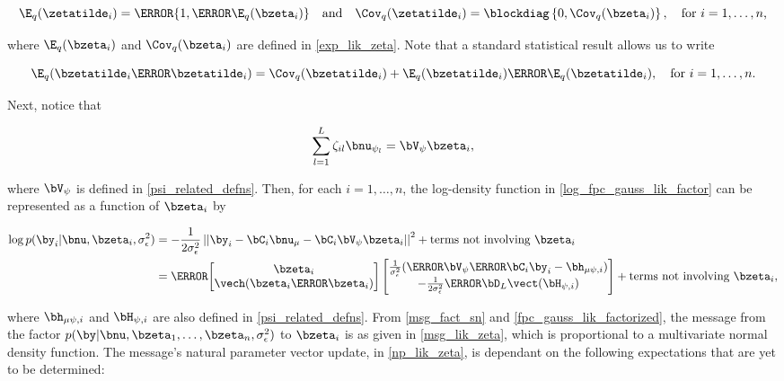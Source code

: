 \documentclass[12pt]{article}
\def\sigsqeps{\sigma^2_{\epsilon}}
\def\numu{\bnu_\mu}
\def\Vpsi{\bV_\psi}
\newcommand\nupsi[1]{\bnu_{\psi_{#1}}}
\newcommand\hmupsi[1]{\bh_{\mu \psi, i}}
\newcommand\Hpsi[1]{\bH_{\psi, i}}
\newcommand\tni[1]{\text{terms not involving $#1$}}
\theoremstyle{plain}
\theoremstyle{definition}
\theoremstyle{remark}
\begin{document}
\begin{equation}
	\E_q (\zetatilde_i) = \T{\{ 1, \T{\E_q (\bzeta_i)} \}} \quad
	\text{and} \quad
	\Cov_q (\zetatilde_i) = \blockdiag \left\{ 0, \Cov_q (\bzeta_i) \right\}, \quad
	\text{for $i = 1, \dots, n$,}
\label{exp_lik_zeta_tilde}
\end{equation}

\noindent where $\E_q (\bzeta_i)$ and $\Cov_q (\bzeta_i)$ are defined in \eqref{exp_lik_zeta}. Note that
a standard statistical result allows us to write

\begin{equation}
	\E_q (\bzetatilde_i \T{\bzetatilde_i}) =
		\Cov_q (\bzetatilde_i) + \E_q (\bzetatilde_i) \T{\E_q (\bzetatilde_i)}, \quad \text{for $i = 1, \dots, n$.}
\label{E_q_outer_zeta}
\end{equation}

Next, notice that

\begin{equation}
	\sum_{l=1}^L \zeta_{il} \nupsi{l} = \Vpsi \bzeta_i,
\label{zeta_simplification}
\end{equation}

\noindent where $\Vpsi$ is defined in \eqref{psi_related_defns}. Then, for each $i = 1, \dots, n$, the log-density function
in \eqref{log_fpc_gauss_lik_factor} can be represented as a function of $\bzeta_i$ by

\begin{align*}
	\log p (\by_i | \bnu, \bzeta_i, \sigsqeps)
		& = -\frac{1}{2\sigsqeps} \left|\left|
			\by_i - \bC_i \numu - \bC_i \Vpsi \bzeta_i
		\right|\right|^2 + \tni{\bzeta_i} \\
		& = \T{
			\begin{bmatrix}
				\bzeta_i \\
				\vech (\bzeta_i \T{\bzeta_i})
			\end{bmatrix}
		} \begin{bmatrix}
			\frac{1}{\sigsqeps} (\T{\Vpsi} \T{\bC_i} \by_i - \hmupsi{i}) \\
			-\frac{1}{2 \sigsqeps} \T{\bD_L} \vect (\Hpsi{i})
		\end{bmatrix} + \tni{\bzeta_i},
\end{align*}

\noindent where $\hmupsi{i}$ and $\Hpsi{i}$ are also defined in \eqref{psi_related_defns}.
\noindent From \eqref{msg_fact_sn} and \eqref{fpc_gauss_lik_factorized}, the message from the factor
$p (\by | \bnu, \bzeta_1, \dots, \bzeta_n, \sigsqeps)$ to $\bzeta_i$ is as given in \eqref{msg_lik_zeta}, which
is proportional to a multivariate normal density function. The message's natural parameter vector update, in
\eqref{np_lik_zeta}, is dependant on the following expectations that are yet to be determined:
\end{document}
